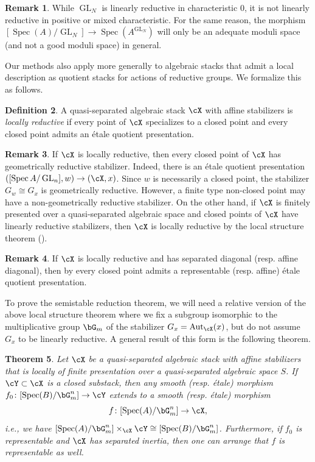 \documentclass[a4paper]{amsart}
\numberwithin{equation}{section}
\theoremstyle{plain}
\newtheorem{thm}{Theorem}[section]
\theoremstyle{definition}
\newtheorem{remark}[thm]{Remark}
\newtheorem{defn}[thm]{Definition}
\DeclareMathOperator{\Spec}{Spec}
\DeclareMathOperator{\GL}{GL}
\DeclareMathOperator{\Aut}{Aut}
\begin{document}
\begin{remark} While $\GL_N$ is linearly reductive in characteristic 0, it is not linearly reductive in positive or mixed characteristic.  For the same reason, the morphism $[\Spec(A) / \GL_N] \to \Spec(A^{\GL_N})$ will only be an adequate moduli space (and not a good moduli space) in general.
\end{remark}

Our methods also apply more generally to algebraic stacks that admit a local description as quotient stacks for actions of reductive groups. We formalize this as follows.

\begin{defn} \label{D:locally-reductive}
A quasi-separated algebraic stack $\cX$ with affine stabilizers is \emph{locally reductive} if every point of $\cX$ specializes to a closed point and every closed point admits  an \'etale quotient presentation.
\end{defn}


\begin{remark} \label{R:locally-reductive}
	{If $\cX$ is locally reductive, then every closed point of $\cX$ has geometrically reductive stabilizer.  Indeed, there is an \'etale quotient presentation $([\Spec A/\GL_n],w) \to (\cX,x)$.  Since $w$ is necessarily a closed point, the stabilizer $G_w \cong G_x$ is geometrically reductive.}	
	However, a finite type non-closed point may have a non-geometrically reductive stabilizer.
	{On the other hand}, if $\cX$ is finitely presented over a quasi-separated algebraic space and closed points of $\cX$ have linearly reductive stabilizers, then $\cX$ is locally reductive by the local structure theorem (). 
\end{remark}

\begin{remark} \label{rmk:local-structure-refinements}
	 If $\cX$ is locally reductive and has separated diagonal (resp. affine diagonal), then {by \cite[Proposition 12.5]{ahr2}} every closed point admits a representable (resp. affine) \'etale quotient presentation.
\end{remark}

To prove the semistable reduction theorem, we will need a relative version of the above local structure theorem where we fix a subgroup isomorphic to the multiplicative group $\bG_m$ of the stabilizer $G_x = \Aut_{\cX}(x)$, but do not assume $G_x$ to be linearly reductive. A general result of this form is the following theorem.

\begin{thm} {\cite[Thms.~1.3 and 1.6]{ahhlr}} \label{T:relativeslice}
Let $\cX$ be a quasi-separated algebraic stack with affine stabilizers that is locally of finite presentation over a quasi-separated algebraic space $S$. If $\cY \subset \cX$ is a closed substack, then any smooth (resp. \'etale) morphism $f_0\colon [\Spec(B)/\bG_m^n] \to \cY$ extends to {a} smooth (resp. \'etale) morphism $$f\colon [\Spec(A)/\bG_m^n] \to \cX,$$ i.e., we have $[\Spec(A)/\bG_m^n] \times_{\cX} \cY \cong [\Spec(B)/\bG_m^n]$. Furthermore, if $f_0$ is representable and $\cX$ has separated inertia, then one can arrange that $f$ is representable as well.
\end{thm}
\end{document}
